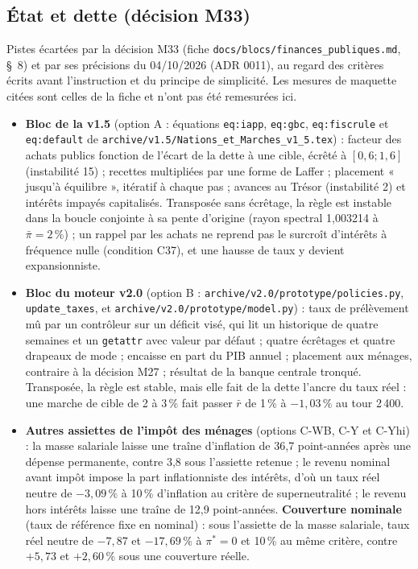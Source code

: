\documentclass[11pt,a4paper]{article}
\begin{document}
\subsection*{État et dette (décision M33)}
Pistes écartées par la décision M33 (fiche \nolinkurl{docs/blocs/finances_publiques.md}, \S~8) et par ses précisions du 04/10/2026 (ADR 0011), au regard des critères écrits avant l'instruction et du principe de simplicité. Les mesures de maquette citées sont celles de la fiche et n'ont pas été remesurées ici.
\begin{itemize}
\item \textbf{Bloc de la v1.5} (option A : équations \texttt{eq:iapp}, \texttt{eq:gbc}, \texttt{eq:fiscrule} et \texttt{eq:default} de \nolinkurl{archive/v1.5/Nations_et_Marches_v1_5.tex}) : facteur des achats publics fonction de l'écart de la dette à une cible, écrêté à $[0{,}6 ; 1{,}6]$ (instabilité 15) ; recettes multipliées par une forme de Laffer ; placement « jusqu'à équilibre », itératif à chaque pas ; avances au Trésor (instabilité 2) et intérêts impayés capitalisés. Transposée sans écrêtage, la règle est instable dans la boucle conjointe à sa pente d'origine (rayon spectral 1,003214 à $\bar\pi = 2\,\%$) ; un rappel par les achats ne reprend pas le surcroît d'intérêts à fréquence nulle (condition C37), et une hausse de taux y devient expansionniste.
\item \textbf{Bloc du moteur v2.0} (option B : \nolinkurl{archive/v2.0/prototype/policies.py}, \texttt{update\_taxes}, et \nolinkurl{archive/v2.0/prototype/model.py}) : taux de prélèvement mû par un contrôleur sur un déficit visé, qui lit un historique de quatre semaines et un \texttt{getattr} avec valeur par défaut ; quatre écrêtages et quatre drapeaux de mode ; encaisse en part du PIB annuel ; placement aux ménages, contraire à la décision M27 ; résultat de la banque centrale tronqué. Transposée, la règle est stable, mais elle fait de la dette l'ancre du taux réel : une marche de cible de 2 à 3\,\% fait passer $\bar r$ de 1\,\% à $-1{,}03\,\%$ au tour 2\,400.
\item \textbf{Autres assiettes de l'impôt des ménages} (options C-WB, C-Y et C-Yhi) : la masse salariale laisse une traîne d'inflation de 36,7 point-années après une dépense permanente, contre 3,8 sous l'assiette retenue ; le revenu nominal avant impôt impose la part inflationniste des intérêts, d'où un taux réel neutre de $-3{,}09\,\%$ à 10\,\% d'inflation au critère de superneutralité ; le revenu hors intérêts laisse une traîne de 12,9 point-années. \textbf{Couverture nominale} (taux de référence fixe en nominal) : sous l'assiette de la masse salariale, taux réel neutre de $-7{,}87$ et $-17{,}69\,\%$ à $\pi^\ast = 0$ et 10\,\% au même critère, contre $+5{,}73$ et $+2{,}60\,\%$ sous une couverture réelle.

\end{itemize}
\end{document}
